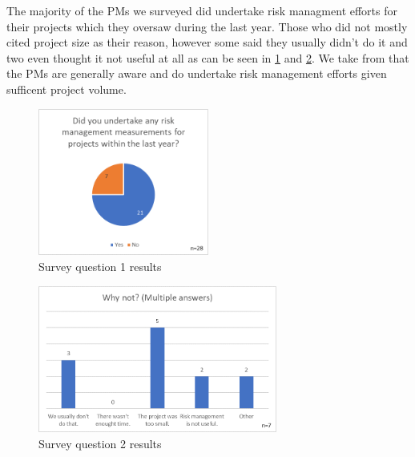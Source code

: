 The majority of the PMs we surveyed did undertake risk managment efforts for their projects which they oversaw during the last year. Those who did not mostly cited project size as their reason, however some said they usually didn't do it and two even thought it not useful at all as can be seen in \ref{fig:label20} and \ref{fig:label21}. We take from that the PMs are generally aware and do undertake risk management efforts given sufficent project volume.
\begin{figure}[H]
	\centering
	\includegraphics[width=0.5\textwidth]{Assets/survey_results/Q1.png}
	\caption{Survey question 1 results}
	\label{fig:label20}
\end{figure}
\begin{figure}[H]
	\centering
	\includegraphics[width=0.7\textwidth]{Assets/survey_results/Q2.png}
	\caption{Survey question 2 results}
	\label{fig:label21}
\end{figure}

